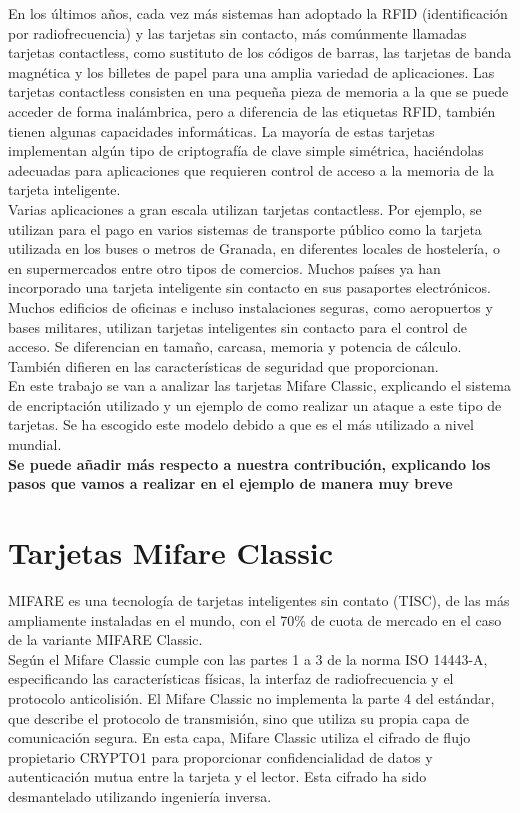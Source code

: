 \documentclass[12pt,a4paper]{article}
\begin{document}
En los últimos años, cada vez más sistemas han adoptado la RFID (identificación por radiofrecuencia) y las tarjetas sin contacto, más comúnmente llamadas tarjetas contactless, como sustituto de los códigos de barras, las tarjetas de banda magnética y los billetes de papel para una amplia variedad de aplicaciones. Las tarjetas contactless consisten en una pequeña pieza de memoria a la que se puede acceder de forma inalámbrica, pero a diferencia de las etiquetas RFID, también tienen algunas capacidades informáticas. La mayoría de estas tarjetas implementan algún tipo de criptografía de clave simple simétrica, haciéndolas adecuadas para aplicaciones que requieren control de acceso a la memoria de la tarjeta inteligente.
\\
Varias aplicaciones a gran escala utilizan tarjetas contactless. Por ejemplo, se utilizan para el pago en varios sistemas de transporte público como la tarjeta utilizada en los buses o metros de Granada, en diferentes locales de hostelería, o en supermercados entre otro tipos de comercios. Muchos países ya han incorporado una tarjeta inteligente sin contacto en sus pasaportes electrónicos. Muchos edificios de oficinas e incluso instalaciones seguras, como aeropuertos y bases militares, utilizan tarjetas inteligentes sin contacto para el control de acceso. Se diferencian en tamaño, carcasa, memoria y potencia de cálculo. También difieren en las características de seguridad que proporcionan.
\\
En este trabajo se van a analizar las tarjetas Mifare Classic, explicando el sistema de encriptación utilizado y un ejemplo de como realizar un ataque a este tipo de tarjetas. Se ha escogido este modelo debido a que es el más utilizado a nivel mundial.
\\
\textbf{Se puede añadir más respecto a nuestra contribución, explicando los pasos que vamos a realizar en el ejemplo de manera muy breve}

\section{Tarjetas Mifare Classic}

MIFARE es una tecnología de tarjetas inteligentes sin contato (TISC), de las más ampliamente instaladas en el mundo, con el 70\% de cuota de mercado en el caso de la variante MIFARE Classic.
\\
Según el Mifare Classic cumple con las partes 1 a 3 de la norma ISO 14443-A, especificando las características físicas, la interfaz de radiofrecuencia y el protocolo anticolisión.  El Mifare Classic no implementa la parte 4 del estándar, que describe el protocolo de transmisión, sino que utiliza su propia capa de comunicación segura. En esta capa, Mifare Classic utiliza el cifrado de flujo propietario CRYPTO1 para proporcionar confidencialidad de datos y autenticación mutua entre la tarjeta y el lector. Esta cifrado ha sido desmantelado utilizando ingeniería inversa.
\end{document}
